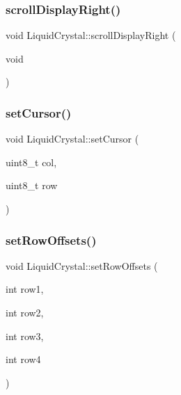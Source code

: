 \subsubsection{\texorpdfstring{scroll\+Display\+Right()}{scrollDisplayRight()}}
{\footnotesize\ttfamily void Liquid\+Crystal\+::scroll\+Display\+Right (\begin{DoxyParamCaption}\item[{void}]{ }\end{DoxyParamCaption})}

\mbox{\label{class_liquid_crystal_a94bc7bf59c72b5d3326844cc0f1c5827}} 
\subsubsection{\texorpdfstring{set\+Cursor()}{setCursor()}}
{\footnotesize\ttfamily void Liquid\+Crystal\+::set\+Cursor (\begin{DoxyParamCaption}\item[{uint8\+\_\+t}]{col,  }\item[{uint8\+\_\+t}]{row }\end{DoxyParamCaption})}

\mbox{\label{class_liquid_crystal_aff7f790aecc51bc80c54db12dbd38129}} 
\subsubsection{\texorpdfstring{set\+Row\+Offsets()}{setRowOffsets()}}
{\footnotesize\ttfamily void Liquid\+Crystal\+::set\+Row\+Offsets (\begin{DoxyParamCaption}\item[{int}]{row1,  }\item[{int}]{row2,  }\item[{int}]{row3,  }\item[{int}]{row4 }\end{DoxyParamCaption})}

\mbox{\label{class_liquid_crystal_a728e6f1ad663aaa59930f64255e30b90}} 
